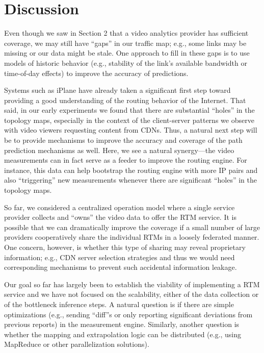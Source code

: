 \section{Discussion}
\label{sec:disc}

 Even though we saw in Section 2 that a video analytics
 provider has sufficient coverage, we may still have ``gaps'' in our traffic map; e.g.,
 some links may be missing or our data might be stale. One approach to fill in these 
gaps is to use models of historic behavior (e.g., stability of the link's available 
 bandwidth or time-of-day effects) to  improve the accuracy of predictions.

 Systems such as iPlane have already taken
a significant first step toward providing a good understanding of the routing
behavior of the Internet. That said, in our early experiments we found that
there are substantial ``holes'' in the topology maps, especially in the context
of the client-server patterns we observe with video viewers requesting content
from CDNs. Thus, a natural next step will be to provide mechanisms to improve
the accuracy and coverage of the path prediction mechanisms as well. Here, we see a natural
synergy---the video measurements can in fact serve as a feeder to improve the
routing engine. For instance, this data can help bootstrap the routing engine
with more IP pairs and also  ``triggering'' new measurements whenever there are
significant ``holes'' in the topology maps. 
 

 So far, we considered a centralized operation model
where a single service provider collects and ``owns'' the video data to offer
the RTM service. It is possible that we can dramatically improve the coverage
if a small number of large providers cooperatively share the individual RTMs in
a loosely federated manner. One concern, however, is whether this type of
sharing may reveal proprietary information; e.g., CDN server selection
strategies and thus we would need corresponding mechanisms to prevent such
accidental information leakage. 

  Our goal so far has largely been to establish the viability 
 of implementing a RTM service and we have not focused on the scalability, either 
of the data collection or of the bottleneck inference steps. A natural question 
 is if there are simple optimizations (e.g., sending ``diff''s or only 
 reporting significant deviations from previous reports) in the measurement 
 engine. Similarly, another question is whether the mapping and extrapolation 
 logic can be distributed (e.g., using MapReduce or other parallelization 
solutions).

